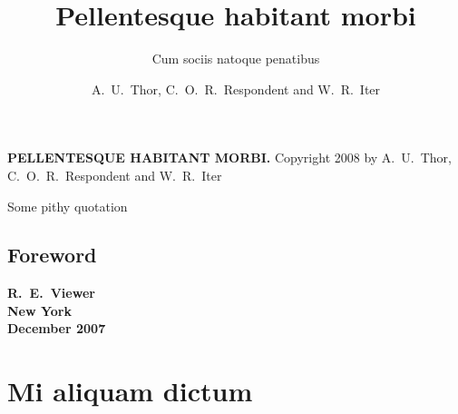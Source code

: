 \documentclass[cfonts]{nostarch}
\begin{document}

    
    
\frontmatter

\author{A.~U.~Thor, C.~O.~R.~Respondent and W.~R.~Iter}

\title{Pellentesque habitant morbi}

\subtitle{Cum sociis natoque penatibus}


\makehalftitle

\maketitle


\begin{copyrightpage}
  \textbf{\sffamily\MakeUppercase{Pellentesque habitant morbi.}}
  Copyright \textcopyright{} 2008 by A.~U.~Thor, C.~O.~R.~Respondent
  and W.~R.~Iter
\end{copyrightpage}

\begin{dedicationpage}
Some pithy quotation
\end{dedicationpage}

\brieftableofcontents

\tableofcontents

\chapter*[Foreword by R.~E.~Viewer]{Foreword}

\lipsum[48-50]

\bigskip

\begin{raggedright}
\bfseries
R.~E.~Viewer\\
New York\\
December 2007
\end{raggedright}

\mainmatter
\part{Mi aliquam dictum}

\lipsum[77-78]
\end{document}
